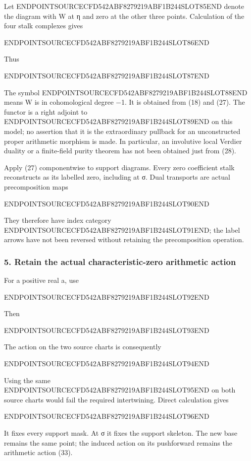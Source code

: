 Let ENDPOINTSOURCECFD542ABF8279219ABF1B244SLOT85END denote the diagram with W at η and zero at the other three points. Calculation of the four stalk complexes gives

ENDPOINTSOURCECFD542ABF8279219ABF1B244SLOT86END

Thus

ENDPOINTSOURCECFD542ABF8279219ABF1B244SLOT87END

The symbol ENDPOINTSOURCECFD542ABF8279219ABF1B244SLOT88END means W is in cohomological degree −1. It is obtained from (18) and (27). The functor is a right adjoint to ENDPOINTSOURCECFD542ABF8279219ABF1B244SLOT89END on this model; no assertion that it is the extraordinary pullback for an unconstructed proper arithmetic morphism is made. In particular, an involutive local Verdier duality or a finite-field purity theorem has not been obtained just from (28).

Apply (27) componentwise to support diagrams. Every zero coefficient stalk reconstructs as its labelled zero, including at σ. Dual transports are actual precomposition maps

ENDPOINTSOURCECFD542ABF8279219ABF1B244SLOT90END

They therefore have index category ENDPOINTSOURCECFD542ABF8279219ABF1B244SLOT91END; the label arrows have not been reversed without retaining the precomposition operation.

\subsubsection{5. Retain the actual characteristic-zero arithmetic action}\label{endpoint-tau_base--retain-the-actual-characteristic-zero-arithmetic-action}

For a positive real a, use

ENDPOINTSOURCECFD542ABF8279219ABF1B244SLOT92END

Then

ENDPOINTSOURCECFD542ABF8279219ABF1B244SLOT93END

The action on the two source charts is consequently

ENDPOINTSOURCECFD542ABF8279219ABF1B244SLOT94END

Using the same ENDPOINTSOURCECFD542ABF8279219ABF1B244SLOT95END on both source charts would fail the required intertwining. Direct calculation gives

ENDPOINTSOURCECFD542ABF8279219ABF1B244SLOT96END

It fixes every support mask. At σ it fixes the support skeleton. The new base remains the same point; the induced action on its pushforward remains the arithmetic action (33).


